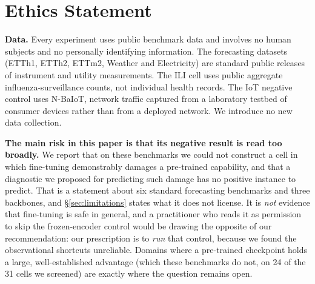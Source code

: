 
\section*{Ethics Statement}

\textbf{Data.}  Every experiment uses public benchmark data and involves no human
subjects and no personally identifying information.  The forecasting datasets
(ETTh1, ETTh2, ETTm2, Weather and Electricity) are standard public
releases of instrument and utility measurements.  The ILI cell uses public
aggregate influenza-surveillance counts, not individual health records.  The IoT
negative control uses N-BaIoT, network traffic captured from a laboratory
testbed of consumer devices rather than from a deployed network.  We introduce no
new data collection.

\textbf{The main risk in this paper is that its negative result is read too
broadly.}  We report that on these benchmarks we could not construct a cell in
which fine-tuning demonstrably damages a pre-trained capability, and that a
diagnostic we proposed for predicting such damage has no positive instance to
predict.  That is a statement about six standard forecasting benchmarks and three
backbones, and \S\ref{sec:limitations} states what it does not license.  It is
\emph{not} evidence that fine-tuning is safe in general, and a practitioner who
reads it as permission to skip the frozen-encoder control would be drawing the
opposite of our recommendation: our prescription is to \emph{run} that control,
because we found the observational shortcuts unreliable.  Domains where a
pre-trained checkpoint holds a large, well-established advantage (which these
benchmarks do not, on 24 of the 31 cells we screened) are exactly where the
question remains open.

